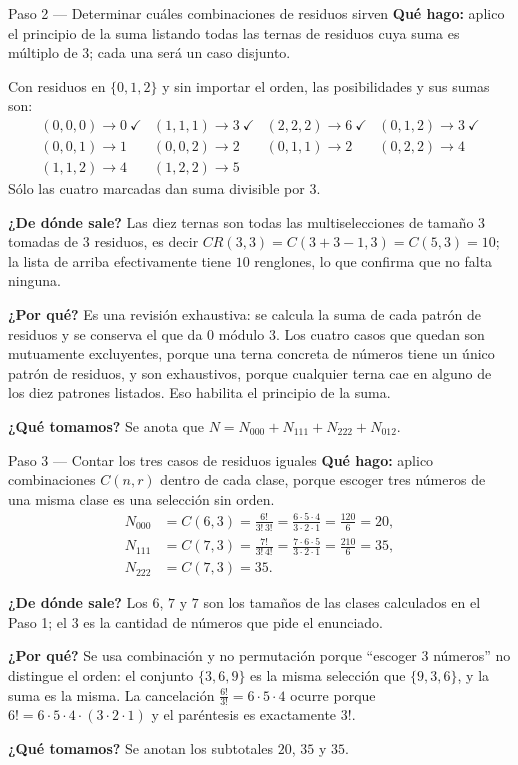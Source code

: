 \documentclass[11pt]{article}
\begin{document}
\begin{paso}{Paso 2 --- Determinar cuáles combinaciones de residuos sirven}
\textbf{Qué hago:} aplico el principio de la suma listando todas las ternas de residuos cuya suma es múltiplo de $3$; cada una será un caso disjunto.

Con residuos en $\{0,1,2\}$ y sin importar el orden, las posibilidades y sus sumas son:
\[
\begin{array}{llll}
 (0,0,0)\to 0\ \checkmark & (1,1,1)\to 3\ \checkmark & (2,2,2)\to 6\ \checkmark & (0,1,2)\to 3\ \checkmark\\
 (0,0,1)\to 1 & (0,0,2)\to 2 & (0,1,1)\to 2 & (0,2,2)\to 4\\
 (1,1,2)\to 4 & (1,2,2)\to 5 & &
\end{array}
\]
Sólo las cuatro marcadas dan suma divisible por $3$.

\textbf{¿De dónde sale?} Las diez ternas son todas las multiselecciones de tamaño $3$ tomadas de $3$ residuos, es decir $CR(3,3)=C(3+3-1,3)=C(5,3)=10$; la lista de arriba efectivamente tiene $10$ renglones, lo que confirma que no falta ninguna.

\textbf{¿Por qué?} Es una revisión exhaustiva: se calcula la suma de cada patrón de residuos y se conserva el que da $0$ módulo $3$. Los cuatro casos que quedan son mutuamente excluyentes, porque una terna concreta de números tiene un único patrón de residuos, y son exhaustivos, porque cualquier terna cae en alguno de los diez patrones listados. Eso habilita el principio de la suma.

\textbf{¿Qué tomamos?} Se anota que $N=N_{000}+N_{111}+N_{222}+N_{012}$.
\end{paso}

\begin{paso}{Paso 3 --- Contar los tres casos de residuos iguales}
\textbf{Qué hago:} aplico combinaciones $C(n,r)$ dentro de cada clase, porque escoger tres números de una misma clase es una selección sin orden.
\begin{align*}
  N_{000}&=C(6,3)=\frac{6!}{3!\,3!}=\frac{6\cdot 5\cdot 4}{3\cdot 2\cdot 1}=\frac{120}{6}=20,\\
  N_{111}&=C(7,3)=\frac{7!}{3!\,4!}=\frac{7\cdot 6\cdot 5}{3\cdot 2\cdot 1}=\frac{210}{6}=35,\\
  N_{222}&=C(7,3)=35 .
\end{align*}

\textbf{¿De dónde sale?} Los $6$, $7$ y $7$ son los tamaños de las clases calculados en el Paso 1; el $3$ es la cantidad de números que pide el enunciado.

\textbf{¿Por qué?} Se usa combinación y no permutación porque ``escoger 3 números'' no distingue el orden: el conjunto $\{3,6,9\}$ es la misma selección que $\{9,3,6\}$, y la suma es la misma. La cancelación $\frac{6!}{3!}=6\cdot 5\cdot 4$ ocurre porque $6!=6\cdot5\cdot4\cdot(3\cdot2\cdot1)$ y el paréntesis es exactamente $3!$.

\textbf{¿Qué tomamos?} Se anotan los subtotales $20$, $35$ y $35$.
\end{paso}
\end{document}
